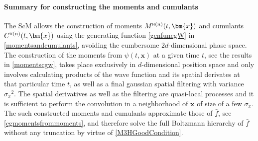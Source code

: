 \documentclass[twocolumn, nofootinbib, showpacs, superscriptaddress]{revtex4-1}
\renewcommand{\H}[0]{{\textsc{h}}}
\newcommand{\sigx}{{\sigma_{\! x}}}
\newcommand{\vx}[0]{\bm{x} }
\newcommand*\myotherbluebox[1]{%
{\setlength{\fboxsep}{1pt}\colorbox{myblue}{#1}}}
\begin{document}
 \paragraph*{Summary for constructing the moments and cumulants}
\myotherbluebox{\begin{minipage}{0.48\textwidth}The ScM allows the construction of moments $M^{\H(n)}(t, \vx)$ and cumulants  $C^{\H(n)}(t, \vx)$ using the generating function \eqref{genfuncgW} in \eqref{momentsandcumulants}, avoiding the cumbersome $2d$-dimensional phase space.
The construction of the moments from $\psi(t, \vx)$ at a given time $t$, see the results in \eqref{momentscgw}, takes place exclusively in $d$-dimensional position space and only involves calculating products of the wave function and its spatial derivates at that particular time $t$, as well as a final gaussian spatial filtering with variance $\sigx^2$. 
The spatial derivatives as well as the filtering are quasi-local processes and it is sufficient to perform the convolution in a neighborhood of $\vx$ of size of a few $\sigx$. 
The such constructed moments and cumulants approximate those of $\bar f$, see \eqref{cgmomentsfrommoments}, and therefore solve the full Boltzmann hierarchy of $\bar f$ without any truncation by virtue of \eqref{M3HGoodCondition}.
\end{minipage}}
\end{document}
